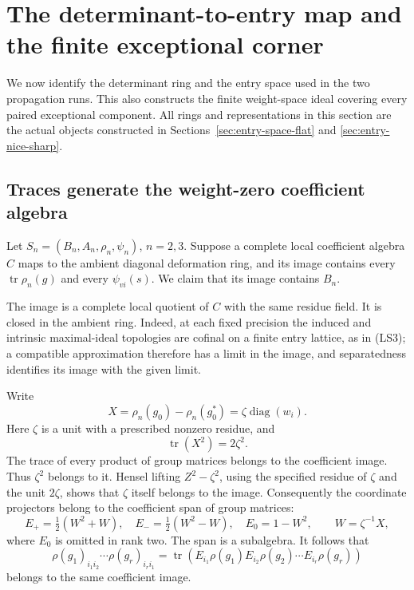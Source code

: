 \section{The determinant-to-entry map and the finite exceptional corner}
\label{sec:det-entry-finite-corner}

We now identify the determinant ring and the entry
space used in the two propagation runs.
This also constructs the finite weight-space ideal
covering every paired exceptional component.
All rings and representations in this section are
the actual objects constructed in
Sections~\ref{sec:entry-space-flat} and
\ref{sec:entry-nice-sharp}.

\subsection{Traces generate the weight-zero coefficient algebra}
Let \(S_n=(B_n,A_n,\rho_n,\psi_n)\), \(n=2,3\).
Suppose a complete local coefficient algebra \(C\)
maps to the ambient diagonal deformation ring,
and its image contains every
\(\operatorname{tr}\rho_n(g)\) and every
\(\psi_{vi}(s)\).
We claim that its image contains \(B_n\).

The image is a complete local quotient of \(C\)
with the same residue field.
It is closed in the ambient ring.
Indeed, at each fixed precision the induced and
intrinsic maximal-ideal topologies are cofinal
on a finite entry lattice, as in (LS3);
a compatible approximation therefore has a limit
in the image, and separatedness identifies its
image with the given limit.

Write
\[
 X=\rho_n(g_0)-\rho_n(g_0^*)
                  =\zeta\operatorname{diag}(w_i).
\]
Here \(\zeta\) is a unit with a prescribed
nonzero residue, and
\[
                  \operatorname{tr}(X^2)=2\zeta^2.            \tag{DC1}
\]
The trace of every product of group matrices
belongs to the coefficient image.
Thus \(\zeta^2\) belongs to it.
Hensel lifting \(Z^2-\zeta^2\), using the
specified residue of \(\zeta\) and the unit
\(2\zeta\), shows that \(\zeta\) itself belongs
to the image.
Consequently the coordinate projectors belong
to the coefficient span of group matrices:
\[
 E_+=\tfrac12(W^2+W),\quad
 E_-=\tfrac12(W^2-W),\quad
 E_0=1-W^2,\qquad W=\zeta^{-1}X,                              \tag{DC2}
\]
where \(E_0\) is omitted in rank two.
The span is a subalgebra.
It follows that
\[
 \rho(g_1)_{i_1i_2}\cdots
 \rho(g_r)_{i_ri_1}
   =\operatorname{tr}
       (E_{i_1}\rho(g_1)E_{i_2}\rho(g_2)
                    \cdots E_{i_r}\rho(g_r))                 \tag{DC3}
\]
belongs to the same coefficient image.

